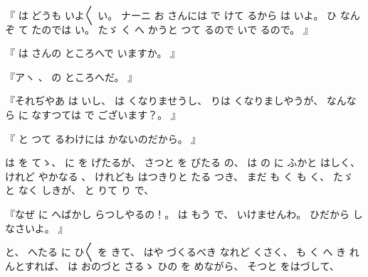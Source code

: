 %
『
は
どうも
いよ〳〵
い。
%
ナーニ
お
さんには
で
けて
るから
は
いよ。
%
ひ
なんぞ
て
たのでは
い。
%
たゞ
く
へ
かうと
つて
るので
いで
るので。
』

%
『
は
さんの
ところへで
いますか。
』

%
『アヽ
、
%
の
ところへだ。
』

%
『それぢやあ
は
いし、
%
は
くなりませうし、
%
りは
くなりましやうが、
%
なんなら
に
なすつては
で
ございます？。
』

%
『
と
つて
るわけには
かないのだから。
』

%
は
を
てゝ、
%
に
を
げたるが、
%
さつと
を
びたる
の、
%
は
の
に
ふかと
はしく、
%
けれど
やかなる
、
%
けれども
はつきりと
たる
つき、
%
まだ
も
く
も
く、
%
たゞ
と
なく
しきが、
%
と
りて
り
で、

%
『なぜ
に
へばかし
らつしやるの！。
%
は
もう
で、
%
いけませんわ。
%
ひだから
しなさいよ。
』

%
と、
%
へたる
に
ひ〳〵
を
きて、
%
はや
づくるべき
なれど
くさく、
%
も
く
へ
き
れんとすれば、
%
は
おのづと
さるゝ
ひの
を
めながら、
%
そつと
をはづして、

